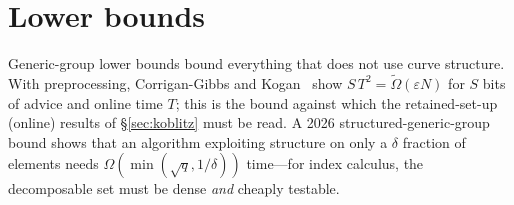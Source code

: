 \section{Lower bounds}

Generic-group lower bounds bound everything that does not use curve
structure. With preprocessing, Corrigan-Gibbs and
Kogan~\cite{cgk2018} show $S\,T^2=\tilde\Omega(\varepsilon N)$ for $S$ bits
of advice and online time $T$; this is the bound against which the
retained-set-up (online) results of \S\ref{sec:koblitz} must be read. A
2026 structured-generic-group bound shows that an algorithm exploiting
structure on only a $\delta$ fraction of elements needs
$\Omega(\min(\sqrt q,1/\delta))$ time---for index calculus, the
decomposable set must be dense \emph{and} cheaply testable.
